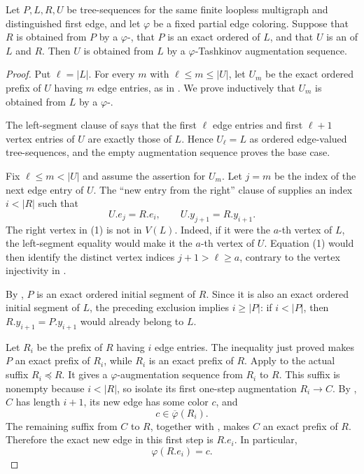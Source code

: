 \begin{lemma}
Let $P,L,R,U$ be tree-sequences for the same finite loopless multigraph
and distinguished first edge, and let $\varphi$ be a fixed partial edge
coloring.  Suppose that $R$ is obtained from $P$ by a
$\varphi$-, that $P$ is an exact
ordered  of $L$, and that $U$ is
an  of $L$ and $R$.  Then $U$ is obtained
from $L$ by a $\varphi$-Tashkinov augmentation sequence.
\end{lemma}
\begin{proof}
Put $\ell=|L|$.  For every $m$ with
$\ell\leq m\leq |U|$, let $U_m$ be the exact ordered prefix of $U$
having $m$ edge entries, as in .  We prove
inductively that $U_m$ is obtained from $L$ by a
$\varphi$-.

The left-segment clause of  says that the first
$\ell$ edge entries and first $\ell+1$ vertex entries of $U$ are
exactly those of $L$.  Hence $U_\ell=L$ as ordered edge-valued
tree-sequences, and the empty augmentation sequence proves the base case.

Fix $\ell\leq m<|U|$ and assume the assertion for $U_m$.  Let $j=m$
be the index of the next edge entry of $U$.  The
``new entry from the right'' clause of  supplies
an index $i<|R|$ such that
\[
 U.e_j=R.e_i,
 \qquad U.y_{j+1}=R.y_{i+1}.                                  \tag{1}
\]
The right vertex in (1) is not in $V(L)$.  Indeed, if it were the
$a$-th vertex of $L$, the left-segment equality would make it the
$a$-th vertex of $U$.  Equation (1) would then identify the distinct
vertex indices $j+1>\ell\geq a$, contrary to the vertex injectivity in
.

By , $P$ is an exact
ordered initial segment of $R$.  Since it is also an exact ordered
initial segment of $L$, the preceding exclusion implies
$i\geq |P|$: if $i<|P|$, then $R.y_{i+1}=P.y_{i+1}$ would already
belong to $L$.

Let $R_i$ be the prefix of $R$ having $i$ edge entries.  The
inequality just proved makes $P$ an exact prefix of $R_i$, while
$R_i$ is an exact prefix of $R$.  Apply
 to the actual suffix
$R_i\preccurlyeq R$.  It gives a $\varphi$-augmentation sequence from
$R_i$ to $R$.  This suffix is nonempty because $i<|R|$, so isolate
its first one-step augmentation $R_i\to C$.  By
, $C$ has length $i+1$, its new edge
has some color $c$, and
\[
                    c\in\overline\varphi(R_i).                 \tag{2}
\]
The remaining suffix from $C$ to $R$, together with
, makes $C$ an
exact prefix of $R$.  Therefore the exact new edge in this first step
is $R.e_i$.  In particular,
\[
                         \varphi(R.e_i)=c.                      \tag{3}
\]


\end{proof}
